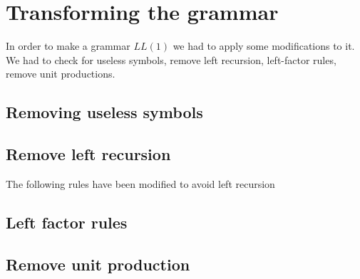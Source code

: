 \section{Transforming the grammar}

In order to make a grammar $LL(1)$ we had to apply some modifications to it. We had to check for useless symbols, remove left recursion, left-factor rules, remove unit productions.

\subsection{Removing useless symbols}


\subsection{Remove left recursion}
The following rules have been modified to avoid left recursion

\subsection{Left factor rules}


\subsection{Remove unit production}


